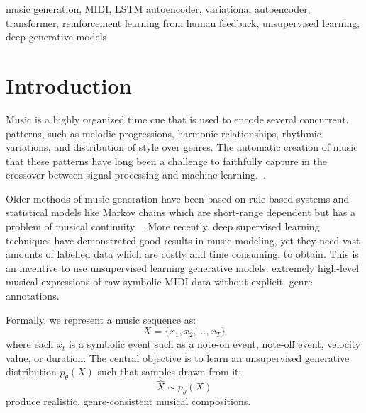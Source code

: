 \documentclass[conference]{IEEEtran}
\begin{document}
\begin{IEEEkeywords}
music generation, MIDI, LSTM autoencoder, variational autoencoder, transformer,
reinforcement learning from human feedback, unsupervised learning, deep generative models
\end{IEEEkeywords}


\section{Introduction}

Music is a highly organized time cue that is used to encode several concurrent.
patterns, such as melodic progressions, harmonic relationships, rhythmic variations,
and distribution of style over genres. The automatic creation of music that
these patterns have long been a challenge to faithfully capture in the
crossover between signal processing and machine learning.~\cite{briot2017deep}.


Older methods of music generation have been based on rule-based systems and
statistical models like Markov chains which are short-range dependent but
has a problem of musical continuity.~\cite{papadopoulos1999ai}. More recently, deep supervised learning techniques have demonstrated good results in music modeling, yet
they need vast amounts of labelled data which are costly and time consuming.
to obtain. This is an incentive to use unsupervised learning generative models.
extremely high-level musical expressions of raw symbolic MIDI data without explicit.
genre annotations.

Formally, we represent a music sequence as:
\begin{equation}
X = \{x_1, x_2, \ldots, x_T\}
\end{equation}
where each $x_t$ is a symbolic event such as a note-on event, note-off event,
velocity value, or duration. The central objective is to learn an unsupervised
generative distribution $p_\theta(X)$ such that samples drawn from it:
\begin{equation}
\hat{X} \sim p_\theta(X)
\end{equation}
produce realistic, genre-consistent musical compositions.
\end{document}
